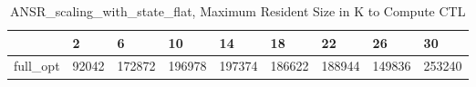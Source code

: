 \begin{table}
\caption{ANSR\_scaling\_with\_state\_flat, Maximum Resident Size in K to Compute CTL}
\label{ANSR_scaling_with_state_flat_CTL_size}
\begin{tabular}{lllllllll}
\toprule
 & 2 & 6 & 10 & 14 & 18 & 22 & 26 & 30 \\
\midrule
full\_opt & 92042 & 172872 & 196978 & 197374 & 186622 & 188944 & 149836 & 253240 \\
\bottomrule
\end{tabular}
\end{table}
